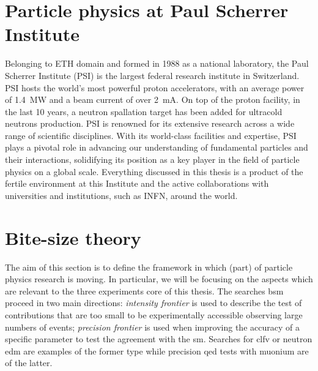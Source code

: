\begin{refsection}
\section{Particle physics at Paul Scherrer Institute} 
    Belonging to ETH domain and formed in 1988 as a national laboratory, the Paul Scherrer Institute (PSI) is the largest federal research institute in Switzerland. 
    PSI hosts the world's most powerful proton accelerators, with an average power of \SI{1.4}{MW} and a beam current of over \SI{2}{mA}.
    On top of the proton facility, in the last 10 years, a neutron spallation target has been added for ultracold neutrons production.  
    PSI is renowned for its extensive research across a wide range of scientific disciplines.
    With its world-class facilities and expertise, PSI plays a pivotal role in advancing our understanding of fundamental particles and their interactions, solidifying its position as a key player in the field of particle physics on a global scale.
    Everything discussed in this thesis is a product of the fertile environment at this Institute and the active collaborations with universities and institutions, such as INFN, around the world.
    
\section{Bite-size theory}
    The aim of this section is to define the framework in which (part) of particle physics research is moving. In particular, we will be focusing on the aspects which are relevant to the three experiments core of this thesis.
    The searches \gls{bsm} proceed in two main directions: \textit{intensity frontier} is used to describe the test of contributions that are too small to be experimentally accessible observing large numbers of events;
    \textit{precision frontier} is used when improving the accuracy of a specific parameter to test the agreement with the \gls{sm}.
    Searches for \gls{clfv} or neutron \gls{edm} are examples of the former type while precision \gls{qed} tests with muonium are of the latter.


\end{refsection}
